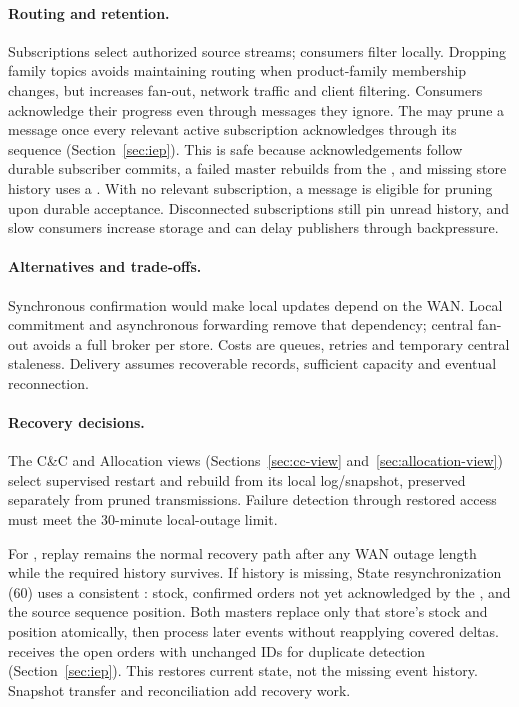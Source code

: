 \paragraph{Routing and retention.}
Subscriptions select authorized source streams; consumers filter locally. Dropping
family topics avoids maintaining routing when product-family membership changes,
but increases fan-out, network traffic and client filtering. Consumers acknowledge
their progress even through messages they ignore.
The \CFE may prune a message once every relevant active subscription acknowledges
through its sequence (Section~\ref{sec:iep}). This is safe because acknowledgements
follow durable subscriber commits, a failed master rebuilds from the \StandbyMaster,
and missing store history uses a \StoreSnapshot. With no relevant subscription, a
message is eligible for pruning upon durable acceptance. Disconnected subscriptions
still pin unread history, and slow consumers increase storage and can delay publishers
through backpressure.

\paragraph{Alternatives and trade-offs.}
Synchronous \DC confirmation would make local updates depend on the WAN.
Local commitment and asynchronous forwarding remove that dependency; central fan-out
avoids a full broker per store. Costs are queues, retries and temporary central
staleness. Delivery assumes recoverable records, sufficient capacity and eventual reconnection.

\paragraph{Recovery decisions.}
The C\&C and Allocation views (Sections~\ref{sec:cc-view} and~\ref{sec:allocation-view})
select supervised \StoreAgent restart and rebuild from its local log/snapshot,
preserved separately from pruned \Outbox transmissions. Failure detection through
restored access must meet the 30-minute local-outage limit.

For , replay remains the normal recovery path after any WAN outage length
while the required history survives. If history is missing, State resynchronization
(60) uses a consistent \StoreSnapshot: stock, confirmed orders not yet acknowledged
by the \DC, and the source sequence position. Both masters replace only that store's
stock and position atomically, then process later events without reapplying covered
deltas. \ShippingOrderFulfillment receives the open orders with unchanged IDs for
duplicate detection (Section~\ref{sec:iep}). This restores current state, not the
missing event history. Snapshot transfer and reconciliation add recovery work.

